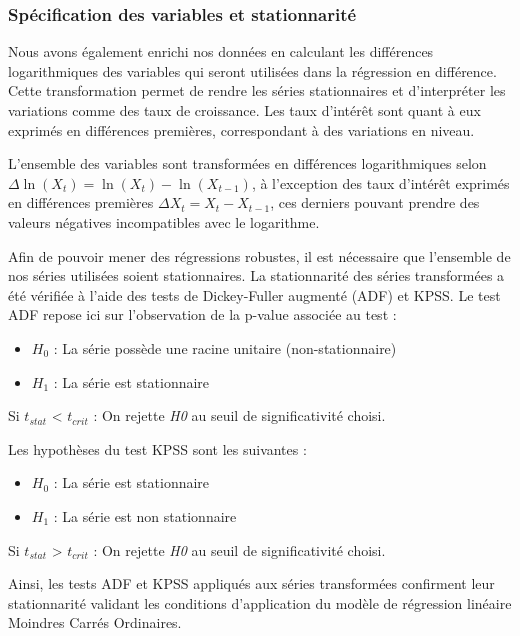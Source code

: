 \documentclass[
]{article}
\begin{document}
\subsubsection{Spécification des variables et
stationnarité}\label{spuxe9cification-des-variables-et-stationnarituxe9}

Nous avons également enrichi nos données en calculant les différences
logarithmiques des variables qui seront utilisées dans la régression en
différence. Cette transformation permet de rendre les séries
stationnaires et d'interpréter les variations comme des taux de
croissance. Les taux d'intérêt sont quant à eux exprimés en différences
premières, correspondant à des variations en niveau.

L'ensemble des variables sont transformées en différences logarithmiques
selon \(\Delta\ln(X_t) = \ln(X_t) - \ln(X_{t-1})\), à l'exception des
taux d'intérêt exprimés en différences premières
\(\Delta X_t = X_t - X_{t-1}\), ces derniers pouvant prendre des valeurs
négatives incompatibles avec le logarithme.

Afin de pouvoir mener des régressions robustes, il est nécessaire que
l'ensemble de nos séries utilisées soient stationnaires. La
stationnarité des séries transformées a été vérifiée à l'aide des tests
de Dickey-Fuller augmenté (ADF) et KPSS. Le test ADF repose ici sur
l'observation de la p-value associée au test :

\begin{itemize}
    \item $H_0$ : La série possède une racine unitaire (non-stationnaire)
    \item $H_1$  : La série est stationnaire
\end{itemize}

Si \(t_{stat}\) \textless{} \(t_{crit}\) : On rejette \emph{H0} au seuil
de significativité choisi.

Les hypothèses du test KPSS sont les suivantes :

\begin{itemize}
  \item $H_0$ : La série est stationnaire
  \item $H_1$ : La série est non stationnaire
\end{itemize}

Si \(t_{stat}\) \textgreater{} \(t_{crit}\) : On rejette \emph{H0} au
seuil de significativité choisi.

Ainsi, les tests ADF et KPSS appliqués aux séries transformées
confirment leur stationnarité validant les conditions d'application du
modèle de régression linéaire Moindres Carrés Ordinaires.
\end{document}

